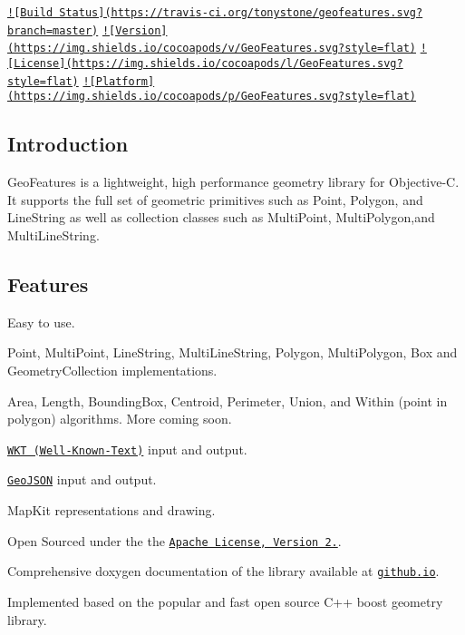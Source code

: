 \href{https://travis-ci.org/tonystone/geofeatures}{\tt !\mbox{[}Build Status\mbox{]}(https\+://travis-\/ci.\+org/tonystone/geofeatures.\+svg?branch=master)} \href{http://cocoapods.org/pods/GeoFeatures}{\tt !\mbox{[}Version\mbox{]}(https\+://img.\+shields.\+io/cocoapods/v/\+Geo\+Features.\+svg?style=flat)} \href{http://cocoapods.org/pods/GeoFeatures}{\tt !\mbox{[}License\mbox{]}(https\+://img.\+shields.\+io/cocoapods/l/\+Geo\+Features.\+svg?style=flat)} \href{http://cocoapods.org/pods/GeoFeatures}{\tt !\mbox{[}Platform\mbox{]}(https\+://img.\+shields.\+io/cocoapods/p/\+Geo\+Features.\+svg?style=flat)}

\subsection*{Introduction}

Geo\+Features is a lightweight, high performance geometry library for Objective-\/\+C. It supports the full set of geometric primitives such as Point, Polygon, and Line\+String as well as collection classes such as Multi\+Point, Multi\+Polygon,and Multi\+Line\+String.

\subsection*{Features}


\begin{DoxyItemize}
\item Easy to use.
\item Point, Multi\+Point, Line\+String, Multi\+Line\+String, Polygon, Multi\+Polygon, Box and Geometry\+Collection implementations.
\item Area, Length, Bounding\+Box, Centroid, Perimeter, Union, and Within (point in polygon) algorithms. More coming soon.
\item \href{https://en.wikipedia.org/wiki/Well-known_text}{\tt W\+K\+T (Well-\/\+Known-\/\+Text)} input and output.
\item \href{http://geojson.org/}{\tt Geo\+J\+S\+O\+N} input and output.
\item Map\+Kit representations and drawing.
\item Open Sourced under the the \href{http://www.apache.org/licenses/LICENSE-2.0.html}{\tt Apache License, Version 2.}.
\item Comprehensive doxygen documentation of the library available at \href{http://tonystone.github.io/geofeatures}{\tt github.\+io}.
\item Implemented based on the popular and fast open source C++ boost geometry library.
\end{DoxyItemize}

